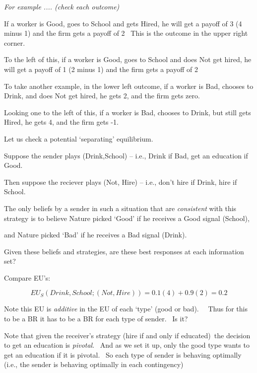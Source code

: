 \documentclass{article}
\begin{document}
\textit{For example .... (check each outcome)}

If a worker is Good, goes to School and gets Hired, he will get a payoff of
3 (4 minus 1) and the firm gets a payoff of 2 \ This is the outcome in the
upper right corner.

\bigskip

To the left of this, if a worker is Good, goes to School and does Not get
hired, he will get a payoff of 1 (2 minus 1) and the firm gets a payoff of 2
\

\bigskip

To take another example, in the lower left outcome, if a worker is Bad,
chooses to Drink, and does Not get hired, he gets 2, and the firm gets zero.
\

Looking one to the left of this, if a worker is Bad, chooses to Drink, but
still gets Hired, he gets 4, and the firm gets -1. \

\bigskip

Let us check a potential `separating' equilibrium.

Suppose the sender plays (Drink,School) -- i.e., Drink if Bad, get an
education if Good.

Then suppose the reciever plays (Not, Hire) -- i.e., don't hire if Drink,
hire if School.

\bigskip

The only beliefs by a sender in such a situation that are \textit{consistent}
with this strategy is to believe Nature picked `Good' if he receives a Good
signal (School),

and Nature picked `Bad' if he receives a Bad signal (Drink). \

\bigskip

Given these beliefs and strategies, are these best responses at each
information set?

\bigskip

Compare EU's:

\[
EU_{S}(Drink,School;(Not,Hire))=0.1(4)+0.9(2)=0.2
\]

Note this EU is \textit{additive} in the EU of each `type' (good or bad). \
\ Thus for this to be a BR it has to be a BR for each type of sender. \ Is
it?

\bigskip

Note that given the receiver's strategy (hire if and only if educated)\ the
decision to get an education is \textit{pivotal}. \ And as we set it up,
only the good type wants to get an education if it is pivotal. \ So each
type of sender is behaving optimally (i.e., the sender is behaving optimally
in each contingency)
\end{document}
